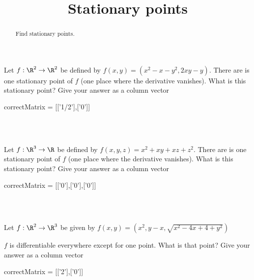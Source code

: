 \documentclass{ximera}
\title{Stationary points}
\begin{document}
	\begin{abstract}
		Find stationary points.
	\end{abstract}
	
	\begin{question}
		Let $f:\R^2 \to \R^2$ be defined by $f(x,y) = (x^2-x-y^2,2xy-y) $.
		There are is one stationary point of $f$ (one place where the derivative vanishes).  
		What is this stationary point?  Give your answer as a column vector
		 
		 \begin{matrix-answer}
		 correctMatrix = [['1/2'],['0']]
		 \end{matrix-answer}
	\end{question}
	\\
	\\
	\begin{question}
		Let $f:\R^3 \to \R$ be defined by $f(x,y,z) = x^2+xy+xz+z^2 $.
		There are is one stationary point of $f$ (one place where the derivative vanishes).  
		What is this stationary point?  Give your answer as a column vector
		 
		 \begin{matrix-answer}
		 correctMatrix = [['0'],['0'],['0']]
		 \end{matrix-answer}
	\end{question}
	\\
	\\
	\begin{question}
		Let $f:\R^2 \to \R^3$ be given by $f(x,y) = (x^2,y-x,\sqrt{x^2-4x+4+y^2})$
		\begin{question}
			$f$ is differentiable everywhere except for one point.  What is that point?  Give your answer as a column vector
			\begin{matrix-answer}
			correctMatrix = [['2'],['0']]
			\end{matrix-answer}
		\end{question}
	\end{question}
\end{document}
